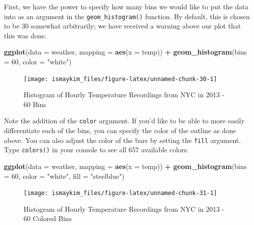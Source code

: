 \documentclass[12pt,]{krantz}
\makeatletter
\newenvironment{Shaded}{\begin{snugshade}}{\end{snugshade}}
\newcommand{\KeywordTok}[1]{\textcolor[rgb]{0.27,0.27,0.27}{\textbf{#1}}}
\newcommand{\DataTypeTok}[1]{\textcolor[rgb]{0.27,0.27,0.27}{#1}}
\newcommand{\DecValTok}[1]{\textcolor[rgb]{0.06,0.06,0.06}{#1}}
\newcommand{\StringTok}[1]{\textcolor[rgb]{0.5,0.5,0.5}{#1}}
\newcommand{\OperatorTok}[1]{\textcolor[rgb]{0.43,0.43,0.43}{\textbf{#1}}}
\newcommand{\NormalTok}[1]{#1}
\newenvironment{kframe}{%
\medskip{}
\setlength{\fboxsep}{.8em}
 \def\at@end@of@kframe{}%
 \ifinner\ifhmode%
  \def\at@end@of@kframe{\end{minipage}}%
  \begin{minipage}{\columnwidth}%
 \fi\fi%
 \def\FrameCommand##1{\hskip\@totalleftmargin \hskip-\fboxsep
 \colorbox{shadecolor}{##1}\hskip-\fboxsep
     \hskip-\linewidth \hskip-\@totalleftmargin \hskip\columnwidth}%
 \MakeFramed {\advance\hsize-\width
   \@totalleftmargin\z@ \linewidth\hsize
   \@setminipage}}%
 {\par\unskip\endMakeFramed%
 \at@end@of@kframe}
\renewenvironment{Shaded}{\begin{kframe}}{\end{kframe}}
\makeatother
\begin{document}
First, we have the power to specify how many bins we would like to put
the data into as an argument in the \texttt{geom\_histogram()} function.
By default, this is chosen to be 30 somewhat arbitrarily; we have
received a warning above our plot that this was done.

\begin{Shaded}
\begin{Highlighting}[]
\KeywordTok{ggplot}\NormalTok{(}\DataTypeTok{data =}\NormalTok{ weather, }\DataTypeTok{mapping =} \KeywordTok{aes}\NormalTok{(}\DataTypeTok{x =}\NormalTok{ temp)) }\OperatorTok{+}
\StringTok{  }\KeywordTok{geom_histogram}\NormalTok{(}\DataTypeTok{bins =} \DecValTok{60}\NormalTok{, }\DataTypeTok{color =} \StringTok{"white"}\NormalTok{)}
\end{Highlighting}
\end{Shaded}

\begin{figure}

{\centering \texttt{[image: ismaykim\_files/figure-latex/unnamed-chunk-30-1]} 

}

\caption{Histogram of Hourly Temperature Recordings from NYC in 2013 - 60 Bins}\label{fig:unnamed-chunk-30}
\end{figure}

Note the addition of the \texttt{color} argument. If you'd like to be
able to more easily differentiate each of the bins, you can specify the
color of the outline as done above. You can also adjust the color of the
bars by setting the \texttt{fill} argument. Type \texttt{colors()} in
your console to see all 657 available colors.

\begin{Shaded}
\begin{Highlighting}[]
\KeywordTok{ggplot}\NormalTok{(}\DataTypeTok{data =}\NormalTok{ weather, }\DataTypeTok{mapping =} \KeywordTok{aes}\NormalTok{(}\DataTypeTok{x =}\NormalTok{ temp)) }\OperatorTok{+}
\StringTok{  }\KeywordTok{geom_histogram}\NormalTok{(}\DataTypeTok{bins =} \DecValTok{60}\NormalTok{, }\DataTypeTok{color =} \StringTok{"white"}\NormalTok{, }\DataTypeTok{fill =} \StringTok{"steelblue"}\NormalTok{)}
\end{Highlighting}
\end{Shaded}

\begin{figure}

{\centering \texttt{[image: ismaykim\_files/figure-latex/unnamed-chunk-31-1]} 

}

\caption{Histogram of Hourly Temperature Recordings from NYC in 2013 - 60 Colored Bins}\label{fig:unnamed-chunk-31}
\end{figure}
\end{document}

